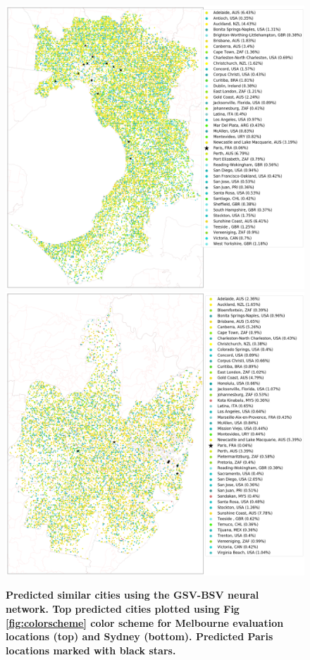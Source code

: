 \documentclass[10pt,letterpaper]{article}
\begin{document}
\begin{figure}[!htbp]
\centering    
\includegraphics[scale=0.16]{Images/MelbourneOverallAbrev_street.png} 
\includegraphics[scale=0.16]{Images/SydneyOverallAbrev_street.png}  
\caption{\bf Predicted similar cities using the GSV-BSV neural network. Top predicted cities plotted using Fig \ref{fig:colorscheme} color scheme for Melbourne evaluation locations (top) and Sydney (bottom). Predicted Paris locations marked with black stars.}   
 \label{fig:melstreet}  
\end{figure} 
\end{document}

